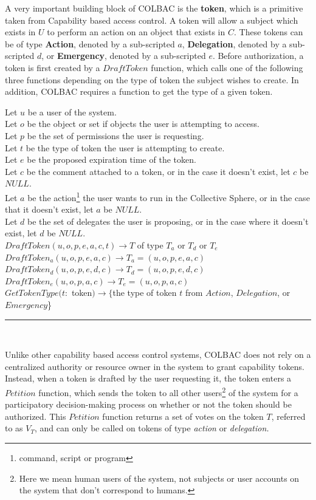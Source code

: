 \noindent A very important building block of COLBAC is the \textbf{token}, which
is a primitive taken from Capability based access control. A token will allow a
subject which exists in $U$ to perform an action on an object that exists in
$C$. These tokens can be of type \textbf{Action}, denoted by a sub-scripted $a$,
\textbf{Delegation}, denoted by a sub-scripted $d$, or \textbf{Emergency},
denoted by a sub-scripted $e$. Before authorization, a token is first created by
a $DraftToken$ function, which calls one of the following three functions
depending on the type of token the subject wishes to create. In addition, COLBAC
requires a function to get the type of a given token.
\begin{definition}\label{def:Tokens}
Let $u$ be a user of the system.\\
Let $o$ be the object or set if objects the user is attempting to access.\\
Let $p$ be the set of permissions the user is requesting.\\
Let $t$ be the type of token the user is attempting to create.\\
Let $e$ be the proposed expiration time of the token.\\
Let $c$ be the comment attached to a token, or in the case it doesn't exist,
let $c$ be $NULL$.\\
Let $a$ be the action\footnote{command, script or program} the user wants to run
in the Collective Sphere, or in the case that it doesn't exist, let $a$ be 
$NULL$.\\
Let $d$ be the set of delegates the user is proposing, or in the case where it
doesn't exist, let $d$ be $NULL$.\\
$DraftToken(u,o,p,e,a,c,t) \rightarrow T$ of type $T_{a}$ or $T_{d}$ or 
$T_{e}$\\
$DraftToken_{a}(u,o,p,e,a,c) \rightarrow T_{a} = (u,o,p,e,a,c)$\\
$DraftToken_{d}(u,o,p,e,d,c) \rightarrow T_{d} = (u,o,p,e,d,c)$\\
$DraftToken_{e}(u,o,p,a,c) \rightarrow T_{e} = (u,o,p,a,c)$\\
$GetTokenType(t:$ token$) \rightarrow \{$the type of token $t$ from $Action$,
$Delegation$, or $Emergency$\}
\hrule \mbox{}\\
\end{definition}

\noindent Unlike other capability based access control systems, COLBAC does not
rely on a centralized authority or resource owner in the system to grant
capability tokens. Instead, when a token is drafted by the user requesting it,
the token enters a $Petition$ function, which sends the token to all other
users\footnote{Here we mean human users of the system, not subjects or user
accounts on the system that don't correspond to humans.} of the system for a
participatory decision-making process on whether or not the token should be
authorized. This $Petition$ function returns a set of votes on the token $T$,
referred to as $V_{T}$, and can only be called on tokens of type \textit{action}
or \textit{delegation.}

